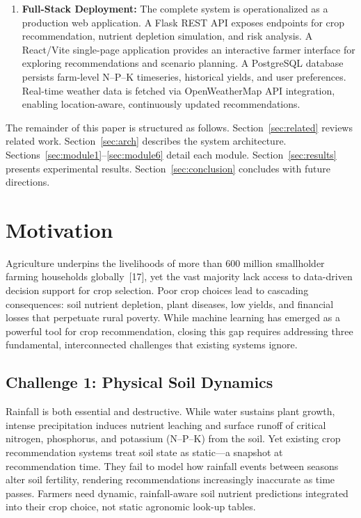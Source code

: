 \documentclass[conference]{IEEEtran}
\begin{document}
\begin{enumerate}
  \item \textbf{Full-Stack Deployment:} The complete system is operationalized as a production web application. A Flask REST API exposes endpoints for crop recommendation, nutrient depletion simulation, and risk analysis. A React/Vite single-page application provides an interactive farmer interface for exploring recommendations and scenario planning. A PostgreSQL database persists farm-level N--P--K timeseries, historical yields, and user preferences. Real-time weather data is fetched via OpenWeatherMap API integration, enabling location-aware, continuously updated recommendations.
\end{enumerate}

The remainder of this paper is structured as follows.
Section~\ref{sec:related} reviews related work.
Section~\ref{sec:arch} describes the system architecture.
Sections~\ref{sec:module1}--\ref{sec:module6} detail each module.
Section~\ref{sec:results} presents experimental results.
Section~\ref{sec:conclusion} concludes with future directions.

\section{Motivation}
\label{sec:motivation}

Agriculture underpins the livelihoods of more than 600 million smallholder
farming households globally~[17], yet the vast majority lack access to
data-driven decision support for crop selection. Poor crop choices lead to
cascading consequences: soil nutrient depletion, plant diseases, low yields,
and financial losses that perpetuate rural poverty. While machine learning has
emerged as a powerful tool for crop recommendation, closing this gap requires
addressing three fundamental, interconnected challenges that existing systems ignore.

\subsection{Challenge 1: Physical Soil Dynamics}

Rainfall is both essential and destructive. While water sustains plant growth,
intense precipitation induces nutrient leaching and surface runoff of critical
nitrogen, phosphorus, and potassium (N--P--K) from the soil. Yet existing crop
recommendation systems treat soil state as static—a snapshot at recommendation
time. They fail to model how rainfall events between seasons alter soil
fertility, rendering recommendations increasingly inaccurate as time passes.
Farmers need dynamic, rainfall-aware soil nutrient predictions integrated into
their crop choice, not static agronomic look-up tables.
\end{document}
